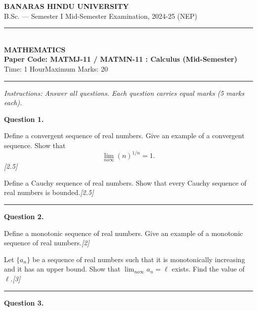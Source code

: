 \documentclass[11pt,a4paper]{article}
\newcommand{\pts}[1]{\hfill   \textit{[#1]}}
\begin{document}
\begin{center}
  {\large\bfseries BANARAS HINDU UNIVERSITY}\\[2pt]
  {\normalsize B.Sc. --- Semester I Mid-Semester Examination, 2024-25 (NEP)}\\[6pt]
  \rule{0.8\linewidth}{0.5pt}\\[6pt]
  {\large\bfseries MATHEMATICS}\\[4pt]
  {\large\bfseries Paper Code: MATMJ-11 / MATMN-11 : Calculus (Mid-Semester)}\\[4pt]
  {\normalsize Time: 1 Hour\hfill Maximum Marks: 20}
\end{center}

\rule{\linewidth}{0.4pt}

\smallskip



\noindent   \textit{Instructions: Answer all questions. Each question carries equal marks (5 marks each).}

\bigskip




\noindent   \textbf{Question 1.}

\begin{parts}
  \item Define a convergent sequence of real numbers. Give an example of a convergent sequence. Show that
  \[
    \lim_{n  o \infty} (n)^{1/n} = 1.
  \]\pts{2.5}
  \item Define a Cauchy sequence of real numbers. Show that every Cauchy sequence of real numbers is bounded.\pts{2.5}
\end{parts}

\medskip\rule{\linewidth}{0.2pt}\medskip




\noindent   \textbf{Question 2.}

\begin{parts}
  \item Define a monotonic sequence of real numbers. Give an example of a monotonic sequence of real numbers.\pts{2}
  \item Let $\{a_n\}$ be a sequence of real numbers such that it is monotonically increasing and it has an upper bound. Show that $\lim_{n  o \infty} a_n = \ell$ exists. Find the value of $\ell$.\pts{3}
\end{parts}

\medskip\rule{\linewidth}{0.2pt}\medskip




\noindent   \textbf{Question 3.}
\end{document}
